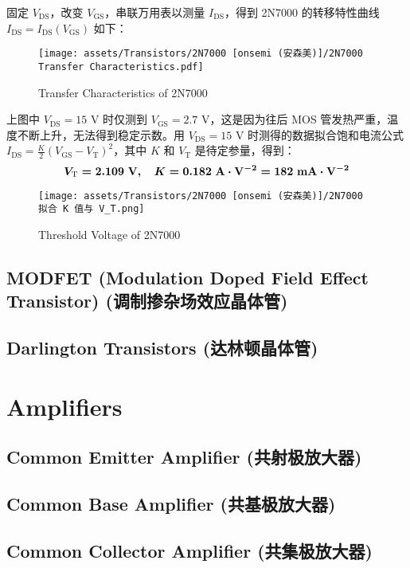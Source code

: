\documentclass[UTF8]{report}
\begin{document}
固定 $V_{\text{DS}}$，改变 $V_\text{GS}$，串联万用表以测量 $I_\text{DS}$，得到 2N7000 的转移特性曲线 $I_\text{DS} = I_\text{DS}(V_\text{GS})$ 如下：
\begin{figure}[H]\centering
    \texttt{[image: assets/Transistors/2N7000 [onsemi (安森美)]/2N7000 Transfer Characteristics.pdf]}
    \caption{Transfer Characteristics of 2N7000}
\end{figure}
上图中 $V_\text{DS} = 15$ V 时仅测到 $V_\text{GS} = 2.7$ V，这是因为往后 MOS 管发热严重，温度不断上升，无法得到稳定示数。用 $V_\text{DS} = 15$ V 时测得的数据拟合饱和电流公式 $I_\text{DS} = \frac{K}{2} \left( V_\text{GS} - V_\text{T} \right)^2$，其中 $K$ 和 $V_\text{T}$ 是待定参量，得到：
\begin{equation}
\boldmath V_\text{T} = 2.109 \ \mathrm{V},\quad K = 0.182 \ \mathrm{A\cdot V^{-2}} = 182 \ \mathrm{mA\cdot V^{-2}}
\end{equation}

\begin{figure}[H]\centering
    \texttt{[image: assets/Transistors/2N7000 [onsemi (安森美)]/2N7000 拟合 K 值与 V\_T.png]}
    \caption{Threshold Voltage of 2N7000}
\end{figure}

\section{MODFET (Modulation Doped Field Effect Transistor) (调制掺杂场效应晶体管) }
\section{Darlington Transistors (达林顿晶体管)}

\chapter{Amplifiers}\thispagestyle{fancy}
\section{Common Emitter Amplifier (共射极放大器)}
\section{Common Base Amplifier (共基极放大器)}
\section{Common Collector Amplifier (共集极放大器)}
\end{document}
